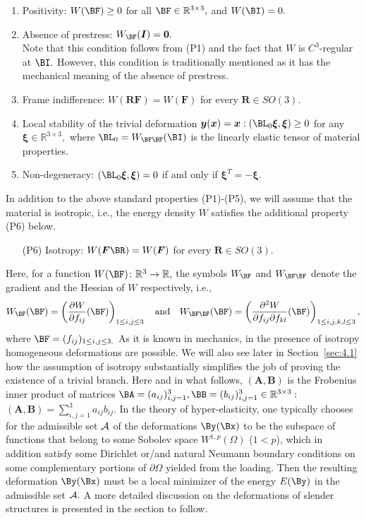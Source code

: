 \begin{enumerate}[label={(P\arabic*)}]
    \item Positivity: $W(\BF)\geq 0$ for all $\BF\in\mathbb R^{3\times 3},$ and $W(\BI)=0.$
        \item Absence of prestress: $W_{\BF}(\boldsymbol{I})=\mathbf{0}.$ \\
      
        Note that this condition follows from (P1) and the fact that $W$ is $C^3$-regular at $\BI.$ However, this condition is traditionally mentioned as it has the mechanical meaning of the absence of prestress. 
    \item Frame indifference: $W( \boldsymbol{R}\boldsymbol{F})=W(\boldsymbol{F})$ for every $\boldsymbol{R} \in S O(3).$
    \item Local stability of the trivial deformation $\boldsymbol{y}(\boldsymbol{x})=\boldsymbol{x}:\left(\BL_{0} \boldsymbol{\xi}, \boldsymbol{\xi}\right) \geq 0$ for any 
    $\boldsymbol{\xi} \in \mathbb{R}^{3 \times 3},$ where $\BL_{0}=W_{\BF\BF}(\BI)$ is the linearly elastic tensor of material properties.
    \item Non-degeneracy: $\left(\BL_{0} \boldsymbol{\xi}, \boldsymbol{\xi}\right)=0$ if and only if $\boldsymbol{\xi}^{T}=-\boldsymbol{\xi}$.
\end{enumerate}
In addition to the above standard properties (P1)-(P5), we will assume that the material is isotropic, i.e., the energy density $W$ satisfies the additional property (P6) below.
\begin{itemize}
    \item[(P6)] Isotropy: $W(\boldsymbol{F}\BR)=W(\boldsymbol{F})$ for every $\boldsymbol{R} \in S O(3).$    
    \end{itemize}
Here, for a function $W(\BF)\colon\mathbb R^3\to\mathbb R,$ the symbols $W_{\BF}$ and $W_{\BF\BF}$ denote the gradient and the Hessian of $W$ respectively, i.e.,
$$
W_{\BF}(\BF)=\left(\frac{\partial W}{\partial f_{ij}}(\BF)\right)_{1\leq i,j\leq 3} \quad\text{and} \quad
W_{\BF\BF}(\BF)=\left(\frac{\partial^2 W}{\partial f_{ij}\partial f_{kl}}(\BF)\right)_{1\leq i,j,k,l\leq 3},
$$
where $\BF=(f_{ij})_{1\leq i,j\leq 3.}$ As it is known in mechanics, in the presence of isotropy homogeneous deformations are possible. We will also see later in Section~\ref{sec:4.1} how the assumption of isotropy substantially simplifies the job of proving the existence of a trivial branch. Here and in what follows, $(\boldsymbol{A}, \boldsymbol{B})$ is the Frobenius inner product of matrices $\BA=(a_{ij})_{i,j=1}^3,\BB=(b_{ij})_{i,j=1}^3\in\mathbb R^{3\times 3}:$ $(\boldsymbol{A}, \boldsymbol{B})=\sum_{i,j=1}^3 a_{ij}b_{ij}.$ In the theory of hyper-elasticity, one typically chooses for the admissible set $\cal A$ of the deformations $\By(\Bx)$ to be the subspace of functions that belong to some Sobolev space $W^{1,p}(\Omega)$ ($1<p$), which in addition satisfy some Dirichlet or/and natural Neumann boundary conditions on some complementary portions of $\partial\Omega$ yielded from the loading. Then the resulting deformation $\By(\Bx)$ must be a local minimizer of the energy $E(\By)$ in the admissible set $\cal A.$ A more detailed discussion on the deformations of slender structures is presented in the section to follow.


